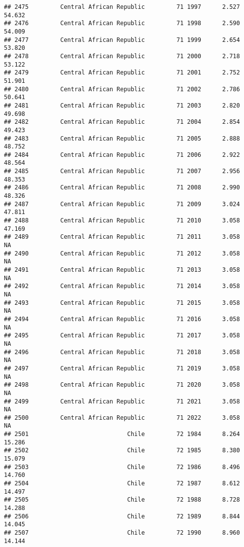 \documentclass[
]{article}
\begin{document}
\begin{verbatim}
## 2475         Central African Republic         71 1997      2.527     54.632
## 2476         Central African Republic         71 1998      2.590     54.009
## 2477         Central African Republic         71 1999      2.654     53.820
## 2478         Central African Republic         71 2000      2.718     53.122
## 2479         Central African Republic         71 2001      2.752     51.901
## 2480         Central African Republic         71 2002      2.786     50.641
## 2481         Central African Republic         71 2003      2.820     49.698
## 2482         Central African Republic         71 2004      2.854     49.423
## 2483         Central African Republic         71 2005      2.888     48.752
## 2484         Central African Republic         71 2006      2.922     48.564
## 2485         Central African Republic         71 2007      2.956     48.353
## 2486         Central African Republic         71 2008      2.990     48.326
## 2487         Central African Republic         71 2009      3.024     47.811
## 2488         Central African Republic         71 2010      3.058     47.169
## 2489         Central African Republic         71 2011      3.058         NA
## 2490         Central African Republic         71 2012      3.058         NA
## 2491         Central African Republic         71 2013      3.058         NA
## 2492         Central African Republic         71 2014      3.058         NA
## 2493         Central African Republic         71 2015      3.058         NA
## 2494         Central African Republic         71 2016      3.058         NA
## 2495         Central African Republic         71 2017      3.058         NA
## 2496         Central African Republic         71 2018      3.058         NA
## 2497         Central African Republic         71 2019      3.058         NA
## 2498         Central African Republic         71 2020      3.058         NA
## 2499         Central African Republic         71 2021      3.058         NA
## 2500         Central African Republic         71 2022      3.058         NA
## 2501                            Chile         72 1984      8.264     15.286
## 2502                            Chile         72 1985      8.380     15.079
## 2503                            Chile         72 1986      8.496     14.760
## 2504                            Chile         72 1987      8.612     14.497
## 2505                            Chile         72 1988      8.728     14.288
## 2506                            Chile         72 1989      8.844     14.045
## 2507                            Chile         72 1990      8.960     14.144

\end{verbatim}
\end{document}
